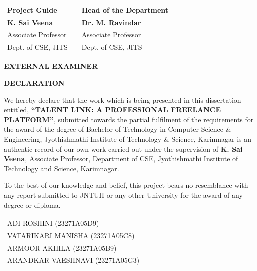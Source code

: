 \documentclass[12pt,a4paper,oneside]{report}
\numberwithin{figure}{chapter}
\numberwithin{table}{chapter}
\begin{document}
\vspace{3cm}

\noindent
\begin{tabular}{p{} p{} p{}}
  \textbf{Project Guide} & & \textbf{Head of the Department} \\[1.5cm]
  \textbf{K. Sai Veena} & & \textbf{Dr. M. Ravindar} \\
  Associate Professor   & & Associate Professor \\
  Dept. of CSE, JITS    & & Dept. of CSE, JITS \\
\end{tabular}

\vspace{2cm}
\begin{center}
  \textbf{EXTERNAL EXAMINER}
\end{center}

\thispagestyle{empty}
\newpage
\begin{center}
  {\fontsize{16}{20}\selectfont\bfseries DECLARATION}
\end{center}
\vspace{2\baselineskip}

{\fontsize{12}{16}\selectfont
\onehalfspacing
We hereby declare that the work which is being presented in this dissertation entitled,
\textbf{``TALENT LINK: A PROFESSIONAL FREELANCE PLATFORM''}, submitted towards the
partial fulfilment of the requirements for the award of the degree of Bachelor of
Technology in Computer Science \& Engineering, Jyothishmathi Institute of Technology
\& Science, Karimnagar is an authentic record of our own work carried out under the
supervision of \textbf{K. Sai Veena}, Associate Professor, Department of CSE,
Jyothishmathi Institute of Technology and Science, Karimnagar.

To the best of our knowledge and belief, this project bears no resemblance with any
report submitted to JNTUH or any other University for the award of any degree or
diploma.
}

\vspace{3cm}
\noindent
\begin{tabular}{p{} p{} p{}}
  ADI ROSHINI (23271A05D9) & & \\[0.8cm]
  VATARIKARI MANISHA (23271A05C8) & & \\[0.8cm]
  ARMOOR AKHILA (23271A05B9) & & \\[0.8cm]
  ARANDKAR VAESHNAVI (23271A05G3) & & \\
\end{tabular}
\end{document}
